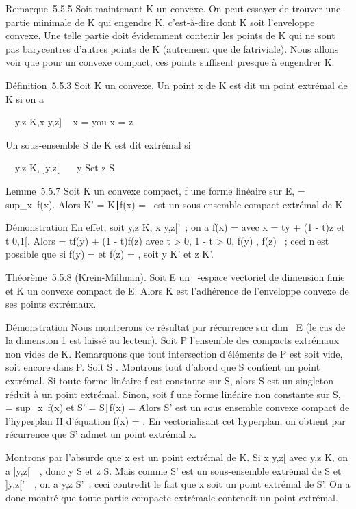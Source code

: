 \documentclass[]{article}
\begin{document}
Remarque~5.5.5 Soit maintenant K un convexe. On peut essayer de trouver
une partie minimale de K qui engendre K, c'est-à-dire dont K soit
l'enveloppe convexe. Une telle partie doit évidemment contenir les
points de K qui ne sont pas barycentres d'autres points de K (autrement
que de fa\ccon triviale). Nous allons voir que pour
un convexe compact, ces points suffisent presque à engendrer K.

Définition~5.5.3 Soit K un convexe. Un point x de K est dit un point
extrémal de K si on a

\forall~~y,z \in K,\quad x \in {[}y,z{]} \rigtharrow~
x = y\text ou x = z

Un sous-ensemble S de K est dit extrémal si

\forall~~y,z \in K,\quad
{]}y,z{[}\bigcapS\neq~\varnothing~\rigtharrow~ y \in S\text et
z \in S

Lemme~5.5.7 Soit K un convexe compact, f une forme linéaire sur E, \mu
= sup\_x\inK~f(x). Alors K' =
\x \in K∣f(x) =
\mu\ est un sous-ensemble compact extrémal de K.

Démonstration En effet, soit y,z \in K, x \in{]}y,z{[}\bigcapK'~; on a f(x) = \mu
avec x = ty + (1 - t)z et t \in{]}0,1{[}. Alors \mu = tf(y) + (1 - t)f(z)
avec t \textgreater{} 0, 1 - t \textgreater{} 0, f(y) \leq \mu, f(z) \leq \mu~;
ceci n'est possible que si f(y) = \mu et f(z) = \mu, soit y \in K' et z \in K'.

Théorème~5.5.8 (Krein-Millman). Soit E un ~-espace vectoriel de
dimension finie et K un convexe compact de E. Alors K est l'adhérence de
l'enveloppe convexe de ses points extrémaux.

Démonstration Nous montrerons ce résultat par récurrence sur
dim~ E (le cas de la dimension 1 est laissé au
lecteur). Soit P l'ensemble des compacts extrémaux non vides de K.
Remarquons que tout intersection d'éléments de P est soit vide, soit
encore dans P. Soit S \inP. Montrons tout d'abord que S contient un point
extrémal. Si toute forme linéaire f est constante sur S, alors S est un
singleton réduit à un point extrémal. Sinon, soit f une forme linéaire
non constante sur S, \mu = sup\_x\inS~f(x)
et S' = \x \in S∣f(x) =
\mu\. Alors S' est un sous ensemble convexe compact de
l'hyperplan H d'équation f(x) = \mu. En vectorialisant cet hyperplan, on
obtient par récurrence que S' admet un point extrémal x.

Montrons par l'absurde que x est un point extrémal de K. Si x \in{]}y,z{[}
avec y,z \in K, on a {]}y,z{[}\bigcapS\neq~\varnothing~, donc y \in S
et z \in S. Mais comme S' est un sous-ensemble extrémal de S et
{]}y,z{[}\bigcapS'\neq~\varnothing~, on a y,z \in S'~; ceci
contredit le fait que x soit un point extrémal de S'. On a donc montré
que toute partie compacte extrémale contenait un point extrémal.
\end{document}
